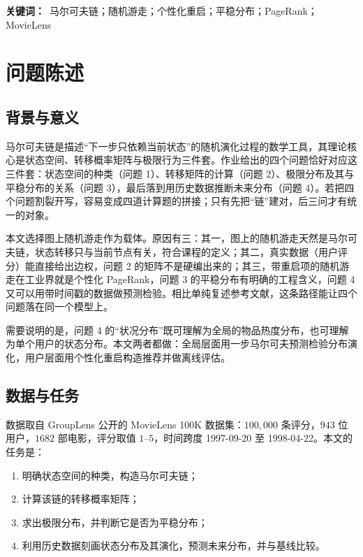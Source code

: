 \documentclass[12pt,a4paper]{ctexart}
\begin{document}
\vspace{0.6em}
\noindent\textbf{关键词：}\ 马尔可夫链；随机游走；个性化重启；平稳分布；PageRank；MovieLens

\newpage
\tableofcontents
\newpage

\section{问题陈述}

\subsection{背景与意义}

马尔可夫链是描述“下一步只依赖当前状态”的随机演化过程的数学工具，其理论核心是状态空间、转移概率矩阵与极限行为三件套。作业给出的四个问题恰好对应这三件套：状态空间的种类（问题 1）、转移矩阵的计算（问题 2）、极限分布及其与平稳分布的关系（问题 3），最后落到用历史数据推断未来分布（问题 4）。若把四个问题割裂开写，容易变成四道计算题的拼接；只有先把“链”建对，后三问才有统一的对象。

本文选择图上随机游走作为载体。原因有三：其一，图上的随机游走天然是马尔可夫链，状态转移只与当前节点有关，符合课程的定义；其二，真实数据（用户评分）能直接给出边权，问题 2 的矩阵不是硬编出来的；其三，带重启项的随机游走在工业界就是个性化 PageRank，问题 3 的平稳分布有明确的工程含义，问题 4 又可以用带时间戳的数据做预测检验。相比单纯复述参考文献，这条路径能让四个问题落在同一个模型上。

需要说明的是，问题 4 的“状况分布”既可理解为全局的物品热度分布，也可理解为单个用户的状态分布。本文两者都做：全局层面用一步马尔可夫预测检验分布演化，用户层面用个性化重启构造推荐并做离线评估。

\subsection{数据与任务}

数据取自 GroupLens 公开的 MovieLens 100K 数据集：$100{,}000$ 条评分，$943$ 位用户，$1682$ 部电影，评分取值 $1$--$5$，时间跨度 1997-09-20 至 1998-04-22。本文的任务是：

\begin{enumerate}[label=(\arabic*),leftmargin=2.2em]
\item 明确状态空间的种类，构造马尔可夫链；
\item 计算该链的转移概率矩阵；
\item 求出极限分布，并判断它是否为平稳分布；
\item 利用历史数据刻画状态分布及其演化，预测未来分布，并与基线比较。
\end{enumerate}
\end{document}
